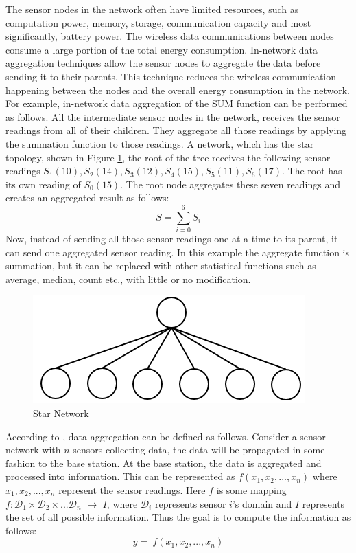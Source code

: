 	The sensor nodes in the network often have limited resources, such as computation power, memory, storage, communication capacity and most significantly, battery power.
	The wireless data communications between nodes consume a large portion of the total energy consumption. 
	In-network data aggregation techniques allow the sensor nodes to aggregate the data before sending it to their parents.
	This technique reduces the wireless communication happening between the nodes and the overall energy consumption in the network. 	
	For example, in-network data aggregation of the SUM function can be performed as follows.
	All the intermediate sensor nodes in the network, receives the sensor readings from all of their children.
	They aggregate all those readings by applying the summation function to those readings.
	A network, which has the star topology, shown in Figure \ref{fig:star-network}, the root of the tree receives the following sensor readings $S_{1}(10),S_{2}(14),S_{3}(12),S_{4}(15),S_{5}(11),S_{6}(17)$.
	The root has its own reading of $S_{0}(15)$. 
	The root node aggregates these seven readings and creates an aggregated result as follows:
	\begin{equation}
		S = \sum_{i=0}^6 S_{i}
	\end{equation}
	Now, instead of sending all those sensor readings one at a time to its parent, it can send one aggregated sensor reading.
	In this example the aggregate function is summation, but it can be replaced with other statistical functions such as average, median, count etc., with little or no modification.
	\begin{figure}[h!]
		\centering
		\includegraphics[scale = 1]{images/star-tree.png}
		\caption{Star Network}
		\label{fig:star-network}
	\end{figure}

	According to \cite{zareafifi2012secure}, data aggregation can be defined as follows.
	Consider a sensor network with $n$ sensors collecting data, the data will be propagated in some fashion to the base station.
	At the base station, the data is aggregated and processed into information. 
	This can be represented as
		$f(x_{1}, x_{2},...,x_{n})$
	where $x_{1}, x_{2},..., x_{n}$ represent the sensor readings.
	Here $f$ is some mapping $f: \mathcal{D}_{1} \times \mathcal{D}_{2} \times ... \mathcal{D}_{n}$ $\rightarrow$ $I$, where $\mathcal{D}_{i}$ represents sensor $i$'s domain and $I$ represents the set of all possible information. 
	Thus the goal is to compute the information as follows:
	\begin{equation}
		\label{eq:aggregation}
		y =\ f(x_{1}, x_{2},...,x_{n})
	\end{equation}


